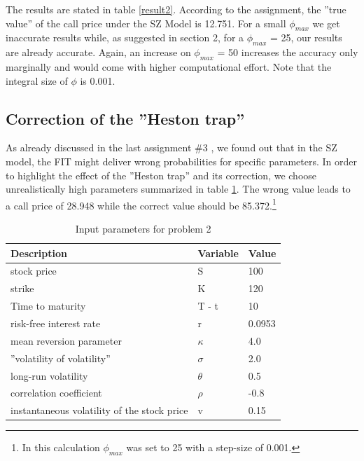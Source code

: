 \documentclass[a4paper,11pt]{article}
\begin{document}
The results are stated in table \ref{result2}. According to the assignment, the ''true value'' of the call price under the SZ Model is 12.751. For a small $\phi_{max}$ we get inaccurate results while, as suggested in section 2, for a $\phi_{max}$ = 25, our results are already accurate. Again, an increase on $\phi_{max}$ = 50 increases the accuracy only marginally and would come with higher computational effort. Note that the integral size of $\phi$ is 0.001.

\subsection{Correction of the ''Heston trap''}
As already discussed in the last assignment $\#$3 , we found out that in the SZ model, the FIT might deliver wrong probabilities for specific parameters.
In order to highlight the effect of the ''Heston trap'' and its correction, we choose unrealistically high parameters summarized in table \ref{input3}. The wrong value leads to a call price of 28.948 while the correct value should be 85.372.\footnote{In this calculation $\phi_{max}$ was set to 25 with a step-size of 0.001.}
\begin{table}[h!]
\centering
\caption{Input parameters for problem 2}
\label{input3}
\begin{tabular}{l|l|l}
\textbf{Description} & \textbf{Variable} & \textbf{Value}  \\\hline
 stock price& S  & 100  \\
 strike& K  & 120 \\
 Time to maturity& T - t  & 10 \\
 risk-free interest rate& r & 0.0953 \\
mean reversion parameter& $\kappa$ & 4.0  \\
 ''volatility of volatility''& $\sigma$ & 2.0 \\
  long-run volatility& $\theta$ & 0.5 \\
   correlation coefficient& $\rho$ & -0.8 \\
   instantaneous volatility of the stock price& v & 0.15 \\
\end{tabular}
\end{table}
\end{document}
